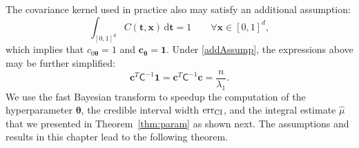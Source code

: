 \documentclass{iitthesis}          %
\newcommand{\bm}[1]{\boldsymbol{#1}}
\newcommand{\D}[1]{\text{d}{#1}}
\newcommand{\vtheta}{{\bm{\theta}}}
\newcommand{\vc}{\bm{c}}
\newcommand{\vt}{\bm{t}}
\newcommand{\vx}{\bm{x}}
\newcommand{\vone}{\bm{1}}
\newcommand{\mCInv}{{\mathsf{C}^{-1}}}
\newcommand{\hmu}{\widehat{\mu}}
\newcommand{\err}{\textup{err}}
\begin{document}
The covariance kernel used in practice also may satisfy an additional assumption:
\begin{equation} \label{addAssump}
\int_{[0,1]^d} C(\vt,\vx) \, \D \vt = 1 \qquad \forall \vx \in [0,1]^d,
\end{equation}
which implies that $c_{0 \vtheta} = 1$ and $\vc_{\vtheta} = \vone$.  Under \eqref{addAssump}, the expressions above may be further simplified:
\begin{equation*}
\vc^T\mCInv \vone =
\vc^T\mCInv \vc = \frac{n}{\lambda_1}.
\end{equation*}
We use the fast Bayesian transform to speedup the computation of the hyperparameter $\vtheta$, the credible interval width $\err_{\textup{CI}}$, and the integral estimate $\hmu$ that we presented in Theorem~\ref{thm:param} as shown next.
\iftrue
The assumptions and results in this chapter lead to the following theorem.
\end{document}

